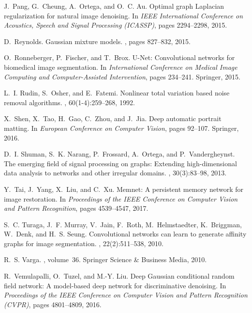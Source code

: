 \documentclass[10pt,twocolumn,letterpaper]{article}
\begin{document}
{\begin{thebibliography}{10}
J.~Pang, G.~Cheung, A.~Ortega, and O.~C. Au.
\newblock Optimal graph {L}aplacian regularization for natural image denoising.
\newblock In {\em IEEE International Conference on Acoustics, Speech and Signal
  Processing (ICASSP)}, pages 2294--2298, 2015.

D.~Reynolds.
\newblock Gaussian mixture models.
, pages 827--832, 2015.

O.~Ronneberger, P.~Fischer, and T.~Brox.
\newblock U-{N}et: {C}onvolutional networks for biomedical image segmentation.
\newblock In {\em International Conference on Medical Image Computing and
  Computer-Assisted Intervention}, pages 234--241. Springer, 2015.

L.~I. Rudin, S.~Osher, and E.~Fatemi.
\newblock Nonlinear total variation based noise removal algorithms.
, 60(1-4):259--268, 1992.

X.~Shen, X.~Tao, H.~Gao, C.~Zhou, and J.~Jia.
\newblock Deep automatic portrait matting.
\newblock In {\em European Conference on Computer Vision}, pages 92--107.
  Springer, 2016.

D.~I. Shuman, S.~K. Narang, P.~Frossard, A.~Ortega, and P.~Vandergheynst.
\newblock The emerging field of signal processing on graphs: {E}xtending
  high-dimensional data analysis to networks and other irregular domains.
, 30(3):83--98, 2013.

Y.~Tai, J.~Yang, X.~Liu, and C.~Xu.
\newblock Memnet: A persistent memory network for image restoration.
\newblock In {\em Proceedings of the IEEE Conference on Computer Vision and
  Pattern Recognition}, pages 4539--4547, 2017.

S.~C. Turaga, J.~F. Murray, V.~Jain, F.~Roth, M.~Helmstaedter, K.~Briggman,
  W.~Denk, and H.~S. Seung.
\newblock Convolutional networks can learn to generate affinity graphs for
  image segmentation.
, 22(2):511--538, 2010.

R.~S. Varga.
, volume~36.
\newblock Springer Science \& Business Media, 2010.

R.~Vemulapalli, O.~Tuzel, and M.-Y. Liu.
\newblock Deep {G}aussian conditional random field network: {A} model-based
  deep network for discriminative denoising.
\newblock In {\em Proceedings of the IEEE Conference on Computer Vision and
  Pattern Recognition (CVPR)}, pages 4801--4809, 2016.


\end{thebibliography}}
\end{document}
